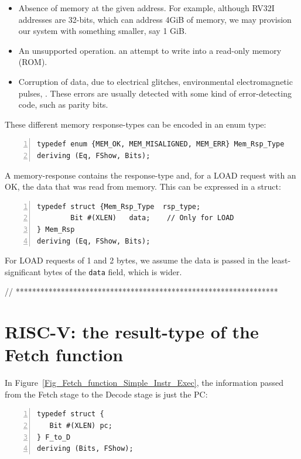 \begin{itemize}

\item Absence of memory at the given address.  For example, although
  RV32I addresses are 32-bits, which can address 4GiB of memory, we
  may provision our system with something smaller, say 1 GiB.

\item An unsupported operation. {\Eg} an attempt to write into a
  read-only memory (ROM).

\item Corruption of data, due to electrical glitches, environmental
  electromagnetic pulses, {\etc}.  These errors are usually detected
  with some kind of error-detecting code, such as parity bits.

\end{itemize}

These different memory response-types can be encoded in an enum type:

\begin{Verbatim}[frame=single, numbers=left]
typedef enum {MEM_OK, MEM_MISALIGNED, MEM_ERR} Mem_Rsp_Type
deriving (Eq, FShow, Bits);
\end{Verbatim}

A memory-response contains the response-type and, for a LOAD request
with an OK, the data that was read from memory.  This can be expressed
in a struct:

\begin{Verbatim}[frame=single, numbers=left]
typedef struct {Mem_Rsp_Type  rsp_type;
		Bit #(XLEN)   data;    // Only for LOAD
} Mem_Rsp
deriving (Eq, FShow, Bits);
\end{Verbatim}

For LOAD requests of 1 and 2 bytes, we assume the data is passed in
the least-significant bytes of the \verb|data| field, which is wider.

// ****************************************************************

\section{RISC-V: the result-type of the Fetch function}

In Figure~\ref{Fig_Fetch_function_Simple_Instr_Exec}, the information
passed from the Fetch stage to the Decode stage is just the PC:

\begin{Verbatim}[frame=single, numbers=left]
typedef struct {
   Bit #(XLEN) pc;
} F_to_D
deriving (Bits, FShow);
\end{Verbatim}

